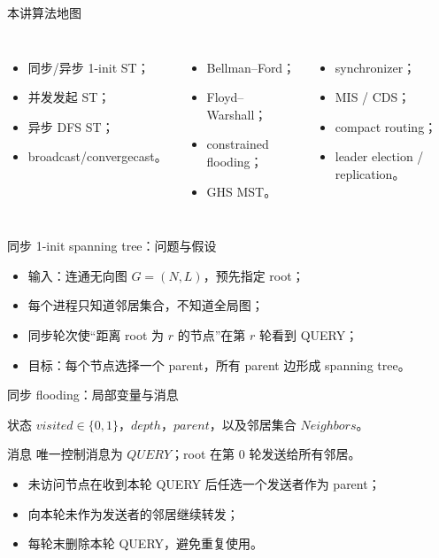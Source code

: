 \documentclass[UTF8,fontset=none,aspectratio=169,10pt]{beamer}
\begin{document}
\begin{frame}{本讲算法地图}\small
\begin{columns}[T,onlytextwidth]
\begin{itemize}
  \item 同步/异步 1-init ST；
  \item 并发发起 ST；
  \item 异步 DFS ST；
  \item broadcast/convergecast。
\end{itemize}
\begin{itemize}
  \item Bellman--Ford；
  \item Floyd--Warshall；
  \item constrained flooding；
  \item GHS MST。
\end{itemize}
\begin{itemize}
  \item synchronizer；
  \item MIS / CDS；
  \item compact routing；
  \item leader election / replication。
\end{itemize}
\end{columns}
\vfill
{}
\end{frame}


\begin{frame}{同步 1-init spanning tree：问题与假设}
\begin{itemize}
  \item 输入：连通无向图 $G=(N,L)$，预先指定 root；
  \item 每个进程只知道邻居集合，不知道全局图；
  \item 同步轮次使“距离 root 为 $r$ 的节点”在第 $r$ 轮看到 QUERY；
  \item 目标：每个节点选择一个 parent，所有 parent 边形成 spanning tree。
\end{itemize}
\vfill
{}
\end{frame}

\begin{frame}{同步 flooding：局部变量与消息}
\begin{block}{状态}
$visited\in\{0,1\}$，$depth$，$parent$，以及邻居集合 $Neighbors$。
\end{block}
\begin{block}{消息}
唯一控制消息为 $QUERY$；root 在第 0 轮发送给所有邻居。
\end{block}
\begin{itemize}
  \item 未访问节点在收到本轮 QUERY 后任选一个发送者作为 parent；
  \item 向本轮未作为发送者的邻居继续转发；
  \item 每轮末删除本轮 QUERY，避免重复使用。
\end{itemize}
\end{frame}
\end{document}
